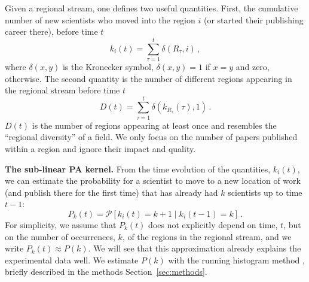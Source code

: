 \documentclass[draft,final]{vutinfth} %
\begin{document}
Given a regional stream, one defines two useful quan\-tities. First, the cumulative number of new scientists who moved into the region $i$ (or started their publishing career there), before time $t$ 
\begin{equation}
    k_i(t) = \sum_{\tau=1}^{t} \delta(R_\tau, i)\, ,
    \label{eq:degree}
\end{equation}
where $\delta(x,y)$ is the Kronecker symbol, $\delta(x,y)=1$ if $x=y$ and zero, otherwise. The second quantity is the number of different regions appearing in the regional stream before time $t$
\begin{equation}
    D(t) = \sum_{\tau=1}^{t} \delta(k_{R_\tau}(\tau), 1)\, .
    \label{eq:dictionary}
\end{equation}
$D(t)$ is the number of regions appearing at least once and resembles the ``regional diversity'' of a field. We only focus on the number of papers published within a region and ignore their impact and quality. 

\vspace{1mm}\noindent\textbf{The sub-linear PA kernel.} 
From the time evolution of the quantities, $k_i(t)$, we can estimate the probability for a scientist to move to a new location of work (and publish there for the first time) that has already had $k$ scientists up to time $t-1$:
\begin{equation}
    P_k(t) = {\mathcal{P}} \left[k_i(t)=k+1 \;|\; k_i(t-1)=k\right]\, .
    \label{eq:attachmentprobability}
\end{equation}
For simplicity, we assume that $P_k(t)$ does not explicitly depend  on time, $t$, but on the number of occurrences, $k$, of the regions in the regional stream, and we write $P_k(t)\approx P(k)$. We will see that this approximation already explains the experimental data well. We estimate $P(k)$ with the running histogram method \cite{Newman01},  briefly described in the methods Section~\ref{sec:methods}.
\end{document}
